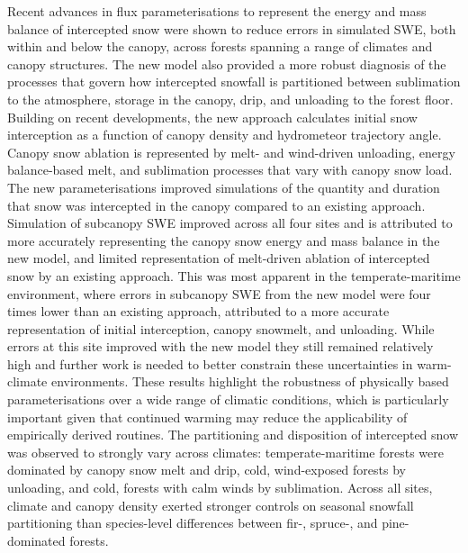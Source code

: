 \documentclass[
  letterpaper,
]{tex/uofsthesis-cs}
\begin{document}
Recent advances in flux parameterisations to represent the energy and
mass balance of intercepted snow were shown to reduce errors in
simulated SWE, both within and below the canopy, across forests spanning
a range of climates and canopy structures. The new model also provided a
more robust diagnosis of the processes that govern how intercepted
snowfall is partitioned between sublimation to the atmosphere, storage
in the canopy, drip, and unloading to the forest floor. Building on
recent developments, the new approach calculates initial snow
interception as a function of canopy density and hydrometeor trajectory
angle. Canopy snow ablation is represented by melt- and wind-driven
unloading, energy balance-based melt, and sublimation processes that
vary with canopy snow load. The new parameterisations improved
simulations of the quantity and duration that snow was intercepted in
the canopy compared to an existing approach. Simulation of subcanopy SWE
improved across all four sites and is attributed to more accurately
representing the canopy snow energy and mass balance in the new model,
and limited representation of melt-driven ablation of intercepted snow
by an existing approach. This was most apparent in the
temperate-maritime environment, where errors in subcanopy SWE from the
new model were four times lower than an existing approach, attributed to
a more accurate representation of initial interception, canopy snowmelt,
and unloading. While errors at this site improved with the new model
they still remained relatively high and further work is needed to better
constrain these uncertainties in warm-climate environments. These
results highlight the robustness of physically based parameterisations
over a wide range of climatic conditions, which is particularly
important given that continued warming may reduce the applicability of
empirically derived routines. The partitioning and disposition of
intercepted snow was observed to strongly vary across climates:
temperate-maritime forests were dominated by canopy snow melt and drip,
cold, wind-exposed forests by unloading, and cold, forests with calm
winds by sublimation. Across all sites, climate and canopy density
exerted stronger controls on seasonal snowfall partitioning than
species-level differences between fir-, spruce-, and pine-dominated
forests.
\end{document}
